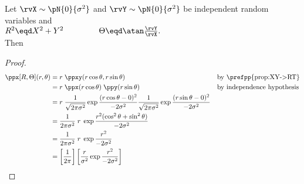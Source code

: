 \begin{proposition}
\label{prop:XY->RT_n}
Let $\rvX\sim\pN{0}{\sigma^2}$ and $\rvY\sim\pN{0}{\sigma^2}$ be
independent random variables and
\\\indentx$R^2 \eqd X^2 + Y^2 \hspace{10ex} \Theta \eqd \atan\frac{\rvY}{\rvX}.$\\
Then
\end{proposition}
\begin{proof}
\begin{align*}
  \ppx[R,\Theta](r,\theta)
    &= r\;\ppxy(r\cos\theta,r\sin\theta)
    && \text{by \prefpp{prop:XY->RT}}
  \\&= r\;\ppx(r\cos\theta) \; \ppy(r\sin\theta)
    && \text{by independence hypothesis}
  \\&= r\;
       \frac{1}{\sqrt{2\pi\sigma^2}}\exp{\frac{(r\cos\theta-0)^2}{-2\sigma^2}}
       \frac{1}{\sqrt{2\pi\sigma^2}}\exp{\frac{(r\sin\theta-0)^2}{-2\sigma^2}}
  \\&= \frac{1}{2\pi\sigma^2}\;r\;
       \exp{\frac{r^2(\cos^2\theta + \sin^2\theta)}{-2\sigma^2}}
  \\&= \frac{1}{2\pi\sigma^2}\;r\;
       \exp{\frac{r^2}{-2\sigma^2}}
  \\&= \left[\frac{1}{2\pi}\right]
       \left[\frac{r}{\sigma^2}\exp{\frac{r^2}{-2\sigma^2}}\right]
\end{align*}
\end{proof}


